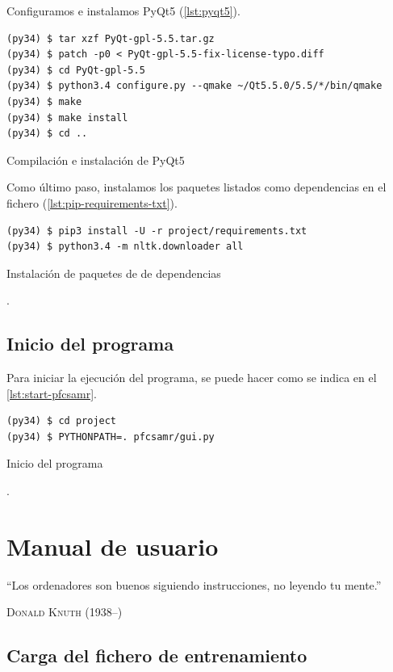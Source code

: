 \newpage
Configuramos e instalamos PyQt5 (\autoref{lst:pyqt5}).

\begin{listing}[htbp]
\begin{verbatim}
(py34) $ tar xzf PyQt-gpl-5.5.tar.gz
(py34) $ patch -p0 < PyQt-gpl-5.5-fix-license-typo.diff
(py34) $ cd PyQt-gpl-5.5
(py34) $ python3.4 configure.py --qmake ~/Qt5.5.0/5.5/*/bin/qmake
(py34) $ make
(py34) $ make install
(py34) $ cd ..
\end{verbatim}
\caption{Compilación e instalación de PyQt5}
\label{lst:pyqt5}
\end{listing}
\FloatBarrier

Como último paso, instalamos los paquetes listados como dependencias en el fichero  (\autoref{lst:pip-requirements-txt}).

\begin{listing}[htbp]
\begin{verbatim}
(py34) $ pip3 install -U -r project/requirements.txt
(py34) $ python3.4 -m nltk.downloader all
\end{verbatim}
\caption{Instalación de paquetes de  de dependencias}.
\label{lst:pip-requirements-txt}
\end{listing}
\FloatBarrier

\section{Inicio del programa}

Para iniciar la ejecución del programa, se puede hacer como se indica en el \autoref{lst:start-pfcsamr}.

\begin{listing}[htbp]
\begin{verbatim}
(py34) $ cd project
(py34) $ PYTHONPATH=. pfcsamr/gui.py
\end{verbatim}
\caption{Inicio del programa}.
\label{lst:start-pfcsamr}
\end{listing}
\FloatBarrier


\chapter{Manual de usuario}

\epigraph{``Los ordenadores son buenos siguiendo instrucciones, no leyendo tu mente.''}{\textsc{Donald Knuth} (1938--)}

\section{Carga del fichero de entrenamiento}

